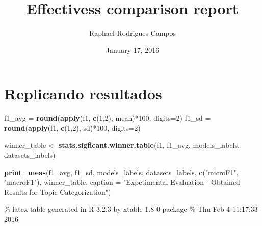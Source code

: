 \documentclass[]{article}
\title{Effectivess comparison report}
\author{Raphael Rodrigues Campos}
\date{January 17, 2016}
\newenvironment{Shaded}{\begin{snugshade}}{\end{snugshade}}
\newcommand{\KeywordTok}[1]{\textcolor[rgb]{0.13,0.29,0.53}{\textbf{{#1}}}}
\newcommand{\DataTypeTok}[1]{\textcolor[rgb]{0.13,0.29,0.53}{{#1}}}
\newcommand{\DecValTok}[1]{\textcolor[rgb]{0.00,0.00,0.81}{{#1}}}
\newcommand{\StringTok}[1]{\textcolor[rgb]{0.31,0.60,0.02}{{#1}}}
\newcommand{\NormalTok}[1]{{#1}}
\begin{document}
\maketitle


\section{Replicando resultados}\label{replicando-resultados}

\begin{Shaded}
\begin{Highlighting}[]
\NormalTok{f1_avg =}\StringTok{ }\KeywordTok{round}\NormalTok{(}\KeywordTok{apply}\NormalTok{(f1, }\KeywordTok{c}\NormalTok{(}\DecValTok{1}\NormalTok{,}\DecValTok{2}\NormalTok{), mean)*}\DecValTok{100}\NormalTok{, }\DataTypeTok{digits=}\DecValTok{2}\NormalTok{)}
\NormalTok{f1_sd =}\StringTok{ }\KeywordTok{round}\NormalTok{(}\KeywordTok{apply}\NormalTok{(f1, }\KeywordTok{c}\NormalTok{(}\DecValTok{1}\NormalTok{,}\DecValTok{2}\NormalTok{), sd)*}\DecValTok{100}\NormalTok{, }\DataTypeTok{digits=}\DecValTok{2}\NormalTok{)}

\NormalTok{winner_table <-}\StringTok{ }\KeywordTok{stats.sigficant.winner.table}\NormalTok{(f1, f1_avg, models_labels, datasets_labels)}

\KeywordTok{print_meas}\NormalTok{(f1_avg, f1_sd, models_labels, datasets_labels,}
           \KeywordTok{c}\NormalTok{(}\StringTok{"microF1"}\NormalTok{, }\StringTok{"macroF1"}\NormalTok{), winner_table, }
           \DataTypeTok{caption =} \StringTok{"Expetimental Evaluation - Obtained Results for Topic Categorization"}\NormalTok{)}
\end{Highlighting}
\end{Shaded}

\% latex table generated in R 3.2.3 by xtable 1.8-0 package \% Thu Feb 4
11:17:33 2016
\end{document}
